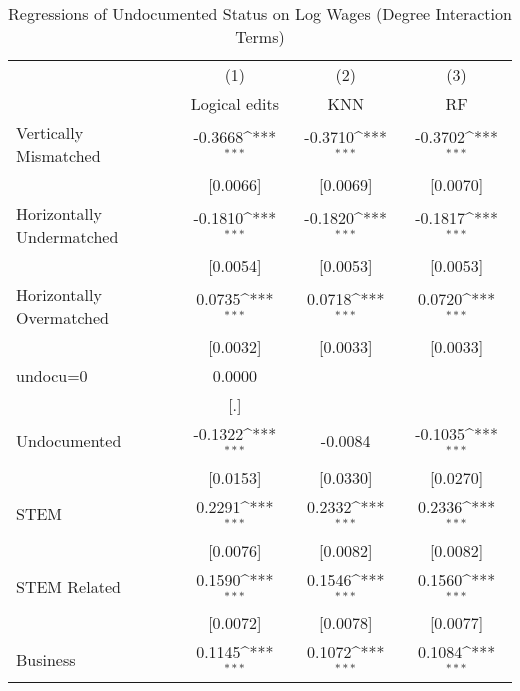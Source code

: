 \begin{table}[htbp]\centering
\def\sym#1{\ifmmode^{#1}\else\(^{#1}\)\fi}
\caption{Regressions of Undocumented Status on Log Wages (Degree Interaction Terms)}
\begin{tabular}{l*{3}{c}}
\toprule
                    &\multicolumn{1}{c}{(1)}         &\multicolumn{1}{c}{(2)}         &\multicolumn{1}{c}{(3)}         \\
                    &Logical edits         &         KNN         &          RF         \\
\midrule
Vertically Mismatched&     -0.3668\sym{***}&     -0.3710\sym{***}&     -0.3702\sym{***}\\
                    &    [0.0066]         &    [0.0069]         &    [0.0070]         \\
\addlinespace
Horizontally Undermatched&     -0.1810\sym{***}&     -0.1820\sym{***}&     -0.1817\sym{***}\\
                    &    [0.0054]         &    [0.0053]         &    [0.0053]         \\
\addlinespace
Horizontally Overmatched&      0.0735\sym{***}&      0.0718\sym{***}&      0.0720\sym{***}\\
                    &    [0.0032]         &    [0.0033]         &    [0.0033]         \\
\addlinespace
undocu=0            &      0.0000         &                     &                     \\
                    &         [.]         &                     &                     \\
\addlinespace
Undocumented        &     -0.1322\sym{***}&     -0.0084         &     -0.1035\sym{***}\\
                    &    [0.0153]         &    [0.0330]         &    [0.0270]         \\
\addlinespace
STEM                &      0.2291\sym{***}&      0.2332\sym{***}&      0.2336\sym{***}\\
                    &    [0.0076]         &    [0.0082]         &    [0.0082]         \\
\addlinespace
STEM Related        &      0.1590\sym{***}&      0.1546\sym{***}&      0.1560\sym{***}\\
                    &    [0.0072]         &    [0.0078]         &    [0.0077]         \\
\addlinespace
Business            &      0.1145\sym{***}&      0.1072\sym{***}&      0.1084\sym{***}\\

\end{tabular}
\end{table}
